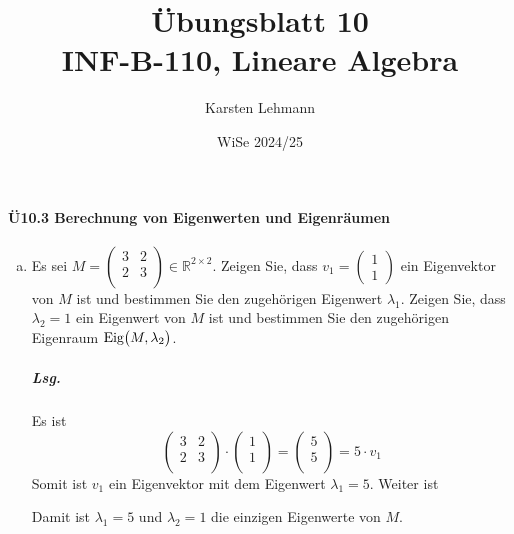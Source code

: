 \documentclass{scrreprt}
\author{Karsten Lehmann}
\date{WiSe 2024/25}
\title{Übungsblatt 10\\INF-B-110, Lineare Algebra}
\begin{document}
\paragraph{Ü10.3 Berechnung von Eigenwerten und Eigenräumen}
\begin{enumerate}[(a)]
\item Es sei $M = \begin{pmatrix}
    3 & 2 \\
    2 & 3 \\
  \end{pmatrix} \in \mathbb{R}^{2 \times 2}$.
  Zeigen Sie, dass $v_1 = \begin{pmatrix} 1 \\ 1 \end{pmatrix}$ ein Eigenvektor
  von $M$ ist und bestimmen Sie den zugehörigen Eigenwert $\lambda_1$.
  Zeigen Sie, dass $\lambda_2 = 1$ ein Eigenwert von $M$ ist und bestimmen Sie
  den zugehörigen Eigenraum $\text{Eig}\qty\big(M, \lambda_2)$.

  \subparagraph{Lsg.} Es ist
  \[
    \begin{pmatrix}
      3 & 2 \\
      2 & 3 \\
    \end{pmatrix} \cdot \begin{pmatrix}
      1 \\
      1 \\
    \end{pmatrix} = \begin{pmatrix}
      5 \\
      5 \\
    \end{pmatrix} = 5 \cdot v_1
  \]
  Somit ist $v_1$ ein Eigenvektor mit dem Eigenwert $\lambda_1 = 5$.
  Weiter ist
  Damit ist $\lambda_1 = 5$ und $\lambda_2 = 1$ die einzigen Eigenwerte von $M$.


\end{enumerate}
\end{document}
